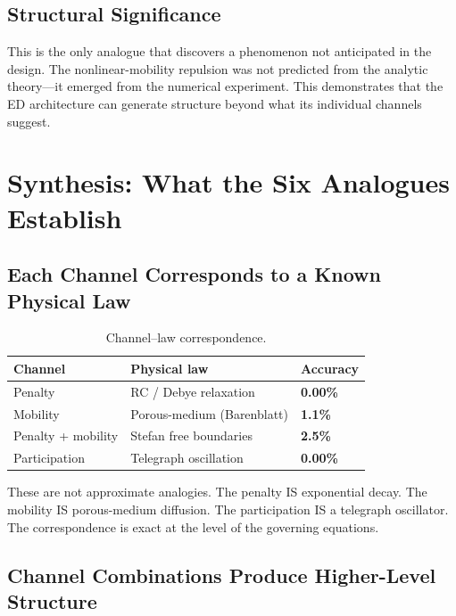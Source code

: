 \documentclass[11pt]{article}
\begin{document}
\subsection{Structural Significance}

This is the only analogue that discovers a phenomenon not anticipated in the design. The nonlinear-mobility repulsion was not predicted from the analytic theory---it emerged from the numerical experiment. This demonstrates that the ED architecture can generate structure beyond what its individual channels suggest.

\section{Synthesis: What the Six Analogues Establish}

\subsection{Each Channel Corresponds to a Known Physical Law}

\begin{table}[h]
\centering
\begin{tabular}{@{}lll@{}}
\toprule
Channel & Physical law & Accuracy \\
\midrule
Penalty & RC / Debye relaxation & \textbf{0.00\%} \\
Mobility & Porous-medium (Barenblatt) & \textbf{1.1\%} \\
Penalty + mobility & Stefan free boundaries & \textbf{2.5\%} \\
Participation & Telegraph oscillation & \textbf{0.00\%} \\
\bottomrule
\end{tabular}
\caption{Channel--law correspondence.}
\label{tab:channel-law}
\end{table}

These are not approximate analogies. The penalty IS exponential decay. The mobility IS porous-medium diffusion. The participation IS a telegraph oscillator. The correspondence is exact at the level of the governing equations.

\subsection{Channel Combinations Produce Higher-Level Structure}
\end{document}
